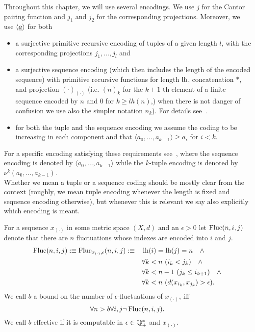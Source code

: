 \begin{rmk} \label{remark-coding}
Throughout this chapter, we will use several encodings. We use $j$ for the Cantor pairing function and $j_1$ and $j_2$ for the corresponding
projections. Moreover, we use $\langle \underline a \rangle$ for both

\begin{itemize}
\item a surjective primitive recursive 
encoding of tuples of a given length $l$, with the corresponding projections $j_1,\ldots,j_l$ and
\item 
a surjective sequence encoding (which then includes the length of the encoded sequence) with primitive recursive functions for length $\operatorname{lh}$, concatenation $*$, 
and projection $(\cdot)_{(\cdot)}$ (i.e. $(n)_k$ for the $k+1$-th element 
of a finite sequence encoded by $n$ and $0$ for $k\ge lh(n)$,) 
when there is not danger of confusion we use also the simpler notation $n_k$). 
For details see~\cite{Kohlenbach08}.
\item 
for both the tuple and the sequence encoding we assume the coding to be 
increasing in each component and that $\langle a_0,\ldots,a_{k-1}\rangle \ge a_i$ for $i<k.$
\end{itemize}

For a specific encoding satisfying these requirements 
see~\cite{Kohlenbach08}, where the sequence
encoding is denoted by $\langle a_0,\ldots,a_{k-1}\rangle$ while the
$k$-tuple encoding is denoted by $\nu^k(a_0,\ldots,a_{k-1})$. \\[1mm] Whether we mean a tuple or a sequence 
coding should be mostly clear from the context (roughly, we mean tuple encoding whenever the length is fixed and sequence encoding otherwise), but whenever this is relevant we say also explicitly which encoding is meant.
\end{rmk}
\begin{dfn}
\label{d:nfluc}
For a sequence $x_{(\cdot)}$ in some metric space $(X,d)$ and an $\epsilon>0$
let $\operatorname{Fluc}(n,i,j)$ denote that there are $n$ fluctuations whose indexes are encoded into $i$ and $j$.
\begin{align*}
\operatorname{Fluc}(n,i,j):\equiv\operatorname{Fluc}_{x_{(\cdot)},\epsilon}(n,i,j):\equiv\quad &\operatorname{lh}(i)=\operatorname{lh}(j)=n\quad \wedge\\ 
&\forall k<n\ (i_k<j_k) \quad \wedge\\
&\forall k<n-1\ (j_k\leq i_{k+1}) \quad \wedge\\
&\forall k<n\ (d(x_{i_k},x_{j_k})>\epsilon).
\end{align*}
We call $b$ a bound on the number of $\epsilon$-fluctuations of $x_{(\cdot)}$, iff 
\[
\forall n>b \forall i,j \neg\operatorname{Fluc}(n,i,j).
\]
We call $b$ effective if it is computable in $\epsilon\in\mathbb{Q}^*_+$ and $x_{(\cdot)}$.
\end{dfn}


